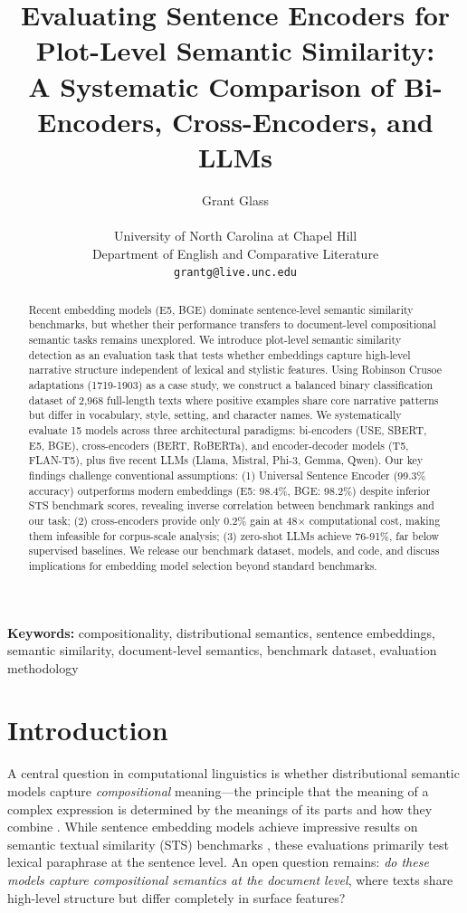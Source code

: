 \documentclass[11pt]{article}
\title{\Large\bfseries Evaluating Sentence Encoders for Plot-Level Semantic Similarity:\\
A Systematic Comparison of Bi-Encoders, Cross-Encoders, and LLMs}
\author{
Grant Glass \\
\\
University of North Carolina at Chapel Hill \\
Department of English and Comparative Literature \\
\texttt{grantg@live.unc.edu}
}
\date{}
\begin{document}
\maketitle

\begin{abstract}
Recent embedding models (E5, BGE) dominate sentence-level semantic similarity benchmarks, but whether their performance transfers to document-level compositional semantic tasks remains unexplored. We introduce plot-level semantic similarity detection as an evaluation task that tests whether embeddings capture high-level narrative structure independent of lexical and stylistic features. Using Robinson Crusoe adaptations (1719-1903) as a case study, we construct a balanced binary classification dataset of 2,968 full-length texts where positive examples share core narrative patterns but differ in vocabulary, style, setting, and character names. We systematically evaluate 15 models across three architectural paradigms: bi-encoders (USE, SBERT, E5, BGE), cross-encoders (BERT, RoBERTa), and encoder-decoder models (T5, FLAN-T5), plus five recent LLMs (Llama, Mistral, Phi-3, Gemma, Qwen). Our key findings challenge conventional assumptions: (1) Universal Sentence Encoder (99.3\% accuracy) outperforms modern embeddings (E5: 98.4\%, BGE: 98.2\%) despite inferior STS benchmark scores, revealing inverse correlation between benchmark rankings and our task; (2) cross-encoders provide only 0.2\% gain at 48× computational cost, making them infeasible for corpus-scale analysis; (3) zero-shot LLMs achieve 76-91\%, far below supervised baselines. We release our benchmark dataset, models, and code, and discuss implications for embedding model selection beyond standard benchmarks.
\end{abstract}

\noindent\textbf{Keywords:} compositionality, distributional semantics, sentence embeddings, semantic similarity, document-level semantics, benchmark dataset, evaluation methodology

\section{Introduction}

A central question in computational linguistics is whether distributional semantic models capture \textit{compositional} meaning---the principle that the meaning of a complex expression is determined by the meanings of its parts and how they combine \cite{Partee1995,Fodor2025Compositionality}. While sentence embedding models achieve impressive results on semantic textual similarity (STS) benchmarks \cite{Cer2017SemEval,Muennighoff2023MTEB}, these evaluations primarily test lexical paraphrase at the sentence level. An open question remains: \textit{do these models capture compositional semantics at the document level}, where texts share high-level structure but differ completely in surface features?
\end{document}
